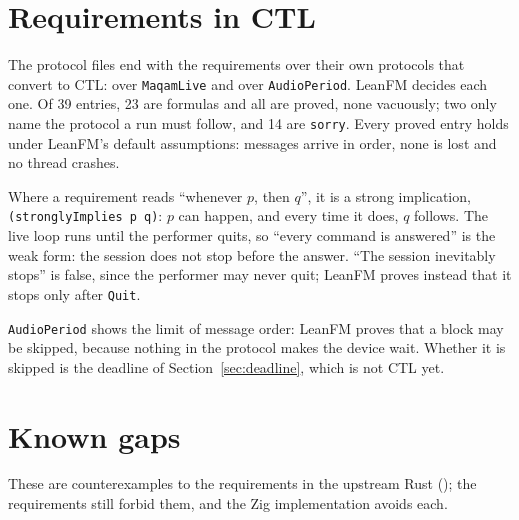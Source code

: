 \documentclass[11pt,oneside]{book}
\begin{document}

\chapter{Requirements in CTL}
The protocol files end with the requirements over their own protocols that
convert to CTL:  over \texttt{MaqamLive} and
 over \texttt{AudioPeriod}. LeanFM decides each
one. Of 39 entries, 23 are formulas and all are proved, none vacuously; two
only name the protocol a run must follow, and 14 are \texttt{sorry}. Every
proved entry holds under LeanFM's default assumptions: messages arrive in
order, none is lost and no thread crashes.

Where a requirement reads ``whenever $p$, then $q$'', it is a strong
implication, \texttt{(stronglyImplies p q)}: $p$ can happen, and every time it
does, $q$ follows. The live loop runs until the performer quits, so ``every
command is answered'' is the weak form: the session does not stop before the
answer. ``The session inevitably stops'' is false, since the performer may
never quit; LeanFM proves instead that it stops only after \texttt{Quit}.

\texttt{AudioPeriod} shows the limit of message order: LeanFM proves that a
block may be skipped, because nothing in the protocol makes the device wait.
Whether it is skipped is the deadline of Section~\ref{sec:deadline}, which is
not CTL yet.

\chapter{Known gaps}\label{ch:gaps}
These are counterexamples to the requirements in the upstream Rust
(); the requirements still forbid them, and the Zig
implementation avoids each.
\end{document}
